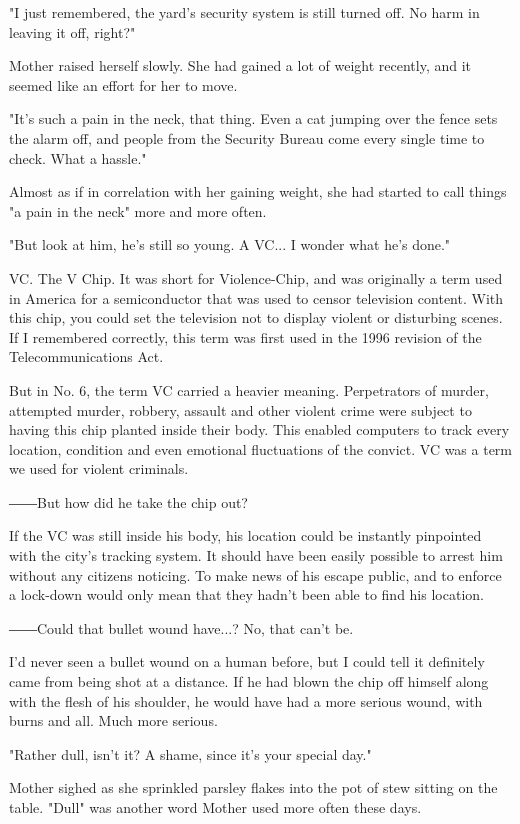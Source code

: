 "I just remembered, the yard's security system is still turned off. No
harm in leaving it off, right?"

Mother raised herself slowly. She had gained a lot of weight recently,
and it seemed like an effort for her to move.

"It's such a pain in the neck, that thing. Even a cat jumping over the
fence sets the alarm off, and people from the Security Bureau come every
single time to check. What a hassle."

Almost as if in correlation with her gaining weight, she had started to
call things "a pain in the neck" more and more often.

"But look at him, he's still so young. A VC... I wonder what he's done."

VC. The V Chip. It was short for Violence-Chip, and was originally a
term used in America for a semiconductor that was used to censor
television content. With this chip, you could set the television not to
display violent or disturbing scenes. If I remembered correctly, this
term was first used in the 1996 revision of the Telecommunications Act.

But in No. 6, the term VC carried a heavier meaning. Perpetrators of
murder, attempted murder, robbery, assault and other violent crime were
subject to having this chip planted inside their body. This enabled
computers to track every location, condition and even emotional
fluctuations of the convict. VC was a term we used for violent
criminals.

――But how did he take the chip out?

If the VC was still inside his body, his location could be instantly
pinpointed with the city's tracking system. It should have been easily
possible to arrest him without any citizens noticing. To make news of
his escape public, and to enforce a lock-down would only mean that they
hadn't been able to find his location.

――Could that bullet wound have...? No, that can't be.

I'd never seen a bullet wound on a human before, but I could tell it
definitely came from being shot at a distance. If he had blown the chip
off himself along with the flesh of his shoulder, he would have had a
more serious wound, with burns and all. Much more serious.

"Rather dull, isn't it? A shame, since it's your special day."

Mother sighed as she sprinkled parsley flakes into the pot of stew
sitting on the table. "Dull" was another word Mother used more often
these days.


